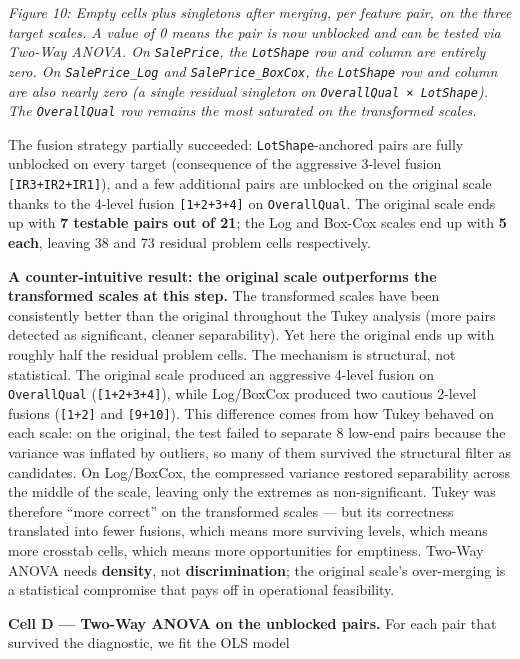 \emph{Figure 10: Empty cells plus singletons after merging, per feature
pair, on the three target scales. A value of 0 means the pair is now
unblocked and can be tested via Two-Way ANOVA. On \texttt{SalePrice},
the \texttt{LotShape} row and column are entirely zero. On
\texttt{SalePrice\_Log} and \texttt{SalePrice\_BoxCox}, the
\texttt{LotShape} row and column are also nearly zero (a single residual
singleton on \texttt{OverallQual\ ×\ LotShape}). The
\texttt{OverallQual} row remains the most saturated on the transformed
scales.}

The fusion strategy partially succeeded: \texttt{LotShape}-anchored
pairs are fully unblocked on every target (consequence of the aggressive
3-level fusion \texttt{{[}IR3+IR2+IR1{]}}), and a few additional pairs
are unblocked on the original scale thanks to the 4-level fusion
\texttt{{[}1+2+3+4{]}} on \texttt{OverallQual}. The original scale ends
up with \textbf{7 testable pairs out of 21}; the Log and Box-Cox scales
end up with \textbf{5 each}, leaving 38 and 73 residual problem cells
respectively.

\textbf{A counter-intuitive result: the original scale outperforms the
transformed scales at this step.} The transformed scales have been
consistently better than the original throughout the Tukey analysis
(more pairs detected as significant, cleaner separability). Yet here the
original ends up with roughly half the residual problem cells. The
mechanism is structural, not statistical. The original scale produced an
aggressive 4-level fusion on \texttt{OverallQual}
(\texttt{{[}1+2+3+4{]}}), while Log/BoxCox produced two cautious 2-level
fusions (\texttt{{[}1+2{]}} and \texttt{{[}9+10{]}}). This difference
comes from how Tukey behaved on each scale: on the original, the test
failed to separate 8 low-end pairs because the variance was inflated by
outliers, so many of them survived the structural filter as candidates.
On Log/BoxCox, the compressed variance restored separability across the
middle of the scale, leaving only the extremes as non-significant. Tukey
was therefore ``more correct'' on the transformed scales --- but its
correctness translated into fewer fusions, which means more surviving
levels, which means more crosstab cells, which means more opportunities
for emptiness. Two-Way ANOVA needs \textbf{density}, not
\textbf{discrimination}; the original scale's over-merging is a
statistical compromise that pays off in operational feasibility.

\textbf{Cell D --- Two-Way ANOVA on the unblocked pairs.} For each pair
that survived the diagnostic, we fit the OLS model

